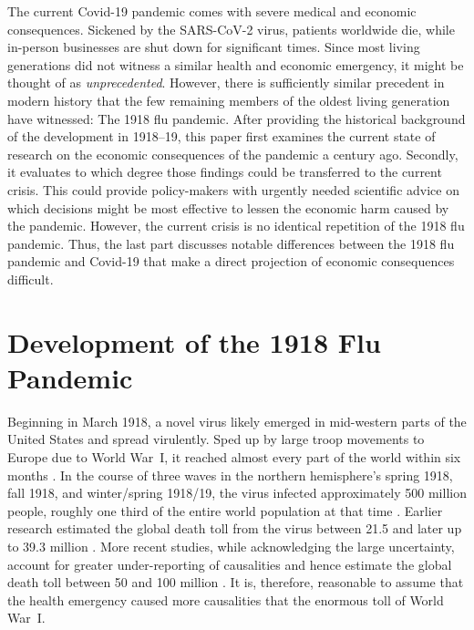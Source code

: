 \documentclass[12pt,a4paper]{article}
\begin{document}
The current Covid-19 pandemic comes with severe medical and economic consequences.
Sickened by the SARS-CoV-2 virus, patients worldwide die, while in-person businesses are shut down for significant times.
Since most living generations did not witness a similar health and economic emergency, it might be thought of as \textit{unprecedented}.
However, there is sufficiently similar precedent in modern history that the few remaining members of the oldest living generation have witnessed: The 1918 flu pandemic.
After providing the historical background of the development in 1918--19, this paper first examines the current state of research on the economic consequences of the pandemic a century ago.
Secondly, it evaluates to which degree those findings could be transferred to the current crisis.
This could provide policy-makers with urgently needed scientific advice on which decisions might be most effective to lessen the economic harm caused by the pandemic.
However, the current crisis is no identical repetition of the 1918 flu pandemic.
Thus, the last part discusses notable differences between the 1918 flu pandemic and Covid-19 that make a direct projection of economic consequences difficult.

\section{Development of the 1918 Flu Pandemic}


Beginning in March 1918, a novel virus likely emerged in mid-western parts of the United States \citep{barrySiteOrigin19182004} and spread virulently.
Sped up by large troop movements to Europe due to World War~I, it reached almost every part of the world within six months \citep{pattersonGeographyMortality19181991}.
In the course of three waves in the northern hemisphere's spring 1918, fall 1918, and winter/spring 1918/19, the virus infected approximately 500 million people, roughly one third of the entire world population at that time \citep{taubenberger1918InfluenzaMother2006}.
Earlier research estimated the global death toll from the virus between 21.5 \citep{jordanEpidemicInfluenzaSurvey1927} and later up to 39.3 million \citep{pattersonGeographyMortality19181991}.
More recent studies, while acknowledging the large uncertainty, account for greater under-reporting of causalities and hence estimate the global death toll between 50 and 100 million \citep{johnsonUpdatingAccountsGlobal2002}.
It is, therefore, reasonable to assume that the health emergency caused more causalities that the enormous toll of World War~I.
\end{document}
